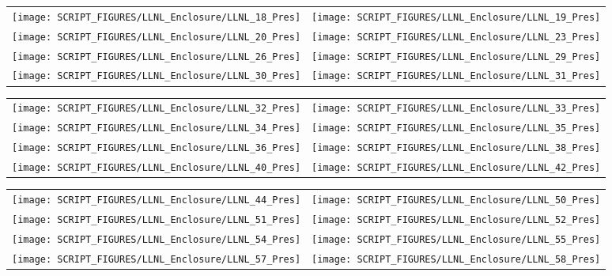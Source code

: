 \begin{figure}[!ht]
\begin{tabular*}{\textwidth}{l@{\extracolsep{\fill}}r}
\texttt{[image: SCRIPT\_FIGURES/LLNL\_Enclosure/LLNL\_18\_Pres]} &
\texttt{[image: SCRIPT\_FIGURES/LLNL\_Enclosure/LLNL\_19\_Pres]} \\
\texttt{[image: SCRIPT\_FIGURES/LLNL\_Enclosure/LLNL\_20\_Pres]} &
\texttt{[image: SCRIPT\_FIGURES/LLNL\_Enclosure/LLNL\_23\_Pres]} \\
\texttt{[image: SCRIPT\_FIGURES/LLNL\_Enclosure/LLNL\_26\_Pres]} &
\texttt{[image: SCRIPT\_FIGURES/LLNL\_Enclosure/LLNL\_29\_Pres]} \\
\texttt{[image: SCRIPT\_FIGURES/LLNL\_Enclosure/LLNL\_30\_Pres]} &
\texttt{[image: SCRIPT\_FIGURES/LLNL\_Enclosure/LLNL\_31\_Pres]}
\end{tabular*}
\label{LLNL_Enclosure_Pres_3}
\end{figure}

\begin{figure}[!ht]
\begin{tabular*}{\textwidth}{l@{\extracolsep{\fill}}r}
\texttt{[image: SCRIPT\_FIGURES/LLNL\_Enclosure/LLNL\_32\_Pres]} &
\texttt{[image: SCRIPT\_FIGURES/LLNL\_Enclosure/LLNL\_33\_Pres]} \\
\texttt{[image: SCRIPT\_FIGURES/LLNL\_Enclosure/LLNL\_34\_Pres]} &
\texttt{[image: SCRIPT\_FIGURES/LLNL\_Enclosure/LLNL\_35\_Pres]} \\
\texttt{[image: SCRIPT\_FIGURES/LLNL\_Enclosure/LLNL\_36\_Pres]} &
\texttt{[image: SCRIPT\_FIGURES/LLNL\_Enclosure/LLNL\_38\_Pres]} \\
\texttt{[image: SCRIPT\_FIGURES/LLNL\_Enclosure/LLNL\_40\_Pres]} &
\texttt{[image: SCRIPT\_FIGURES/LLNL\_Enclosure/LLNL\_42\_Pres]}
\end{tabular*}
\label{LLNL_Enclosure_Pres_4}
\end{figure}

\begin{figure}[!ht]
\begin{tabular*}{\textwidth}{l@{\extracolsep{\fill}}r}
\texttt{[image: SCRIPT\_FIGURES/LLNL\_Enclosure/LLNL\_44\_Pres]} &
\texttt{[image: SCRIPT\_FIGURES/LLNL\_Enclosure/LLNL\_50\_Pres]} \\
\texttt{[image: SCRIPT\_FIGURES/LLNL\_Enclosure/LLNL\_51\_Pres]} &
\texttt{[image: SCRIPT\_FIGURES/LLNL\_Enclosure/LLNL\_52\_Pres]} \\
\texttt{[image: SCRIPT\_FIGURES/LLNL\_Enclosure/LLNL\_54\_Pres]} &
\texttt{[image: SCRIPT\_FIGURES/LLNL\_Enclosure/LLNL\_55\_Pres]} \\
\texttt{[image: SCRIPT\_FIGURES/LLNL\_Enclosure/LLNL\_57\_Pres]} &
\texttt{[image: SCRIPT\_FIGURES/LLNL\_Enclosure/LLNL\_58\_Pres]}
\end{tabular*}
\label{LLNL_Enclosure_Pres_5}
\end{figure}

